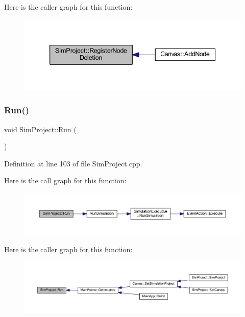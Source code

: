 Here is the caller graph for this function\+:
\nopagebreak
\begin{figure}[H]
\begin{center}
\leavevmode
\includegraphics[width=339pt]{class_sim_project_ab35e169ce5201aeaa7a251a0d043d7f6_icgraph}
\end{center}
\end{figure}
\mbox{\label{class_sim_project_a955725a364c7a26c2991a0013976fc73}} 
\subsubsection{\texorpdfstring{Run()}{Run()}}
{\footnotesize\ttfamily void Sim\+Project\+::\+Run (\begin{DoxyParamCaption}{ }\end{DoxyParamCaption})}



Definition at line 103 of file Sim\+Project.\+cpp.

Here is the call graph for this function\+:
\nopagebreak
\begin{figure}[H]
\begin{center}
\leavevmode
\includegraphics[width=350pt]{class_sim_project_a955725a364c7a26c2991a0013976fc73_cgraph}
\end{center}
\end{figure}
Here is the caller graph for this function\+:
\nopagebreak
\begin{figure}[H]
\begin{center}
\leavevmode
\includegraphics[width=350pt]{class_sim_project_a955725a364c7a26c2991a0013976fc73_icgraph}
\end{center}
\end{figure}
\mbox{\label{class_sim_project_aa0e8fbbc7a2307501e31601ac6e9d967}} 
